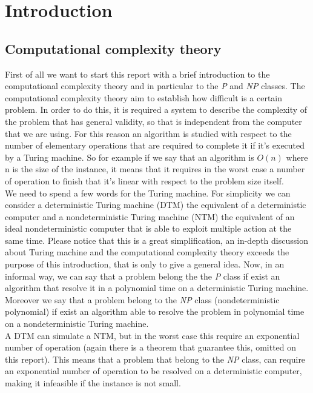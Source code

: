 \chapter{Introduction}

\section{Computational complexity theory}
First of all we want to start this report with a brief introduction to the computational complexity theory and in particular to the \textit{P} and \textit{NP}
classes. 
The computational complexity theory aim to establish how difficult is a certain problem. In order to do this, it is required a system to describe the complexity of the problem that has general validity, so that is independent from the computer that we are using. For this reason an algorithm is studied with respect to the number of elementary operations that are required to complete it if it's executed by a Turing machine. So for example if we say that an algorithm is $O(n)$ where n is the size of the instance, it means that it requires in the worst case a number of operation to finish that it's linear with respect to the problem size itself. \\
We need to spend a few words for the Turing machine. For simplicity we can consider a deterministic Turing machine (DTM) the equivalent of a deterministic computer and a nondeterministic Turing machine (NTM) the equivalent of an ideal nondeterministic computer that is able to exploit multiple action at the same time. Please notice that this is a great simplification, an in-depth discussion about Turing machine and the computational complexity theory exceeds the purpose of this introduction, that is only to give a general idea. 
Now, in an informal way, we can say that a problem belong the the \textit{P} class if exist an algorithm that resolve it in a polynomial time on a deterministic Turing machine. Moreover we say that a problem belong to the \textit{NP} class (nondeterministic polynomial) if exist an algorithm able to resolve the problem in polynomial time on a nondeterministic Turing machine. \\
A DTM can simulate a NTM, but in the worst case this require an exponential number of operation (again there is a theorem that guarantee this, omitted on this report). This means that a problem that belong to the \textit{NP} class, can require an exponential number of operation to be resolved on a deterministic computer, making it infeasible if the instance is not small. \\
